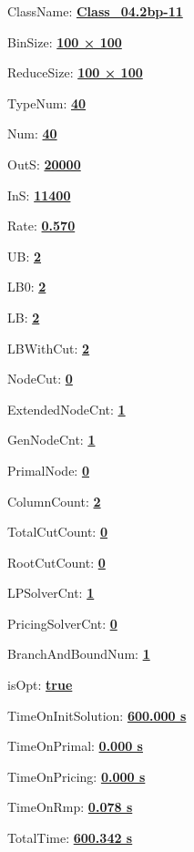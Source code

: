 \documentclass[11pt]{article}
\begin{document}
\pagestyle{empty}


ClassName: \underline{\textbf{Class_04.2bp-11}}
\par
BinSize: \underline{\textbf{100 × 100}}
\par
ReduceSize: \underline{\textbf{100 × 100}}
\par
TypeNum: \underline{\textbf{40}}
\par
Num: \underline{\textbf{40}}
\par
OutS: \underline{\textbf{20000}}
\par
InS: \underline{\textbf{11400}}
\par
Rate: \underline{\textbf{0.570}}
\par
UB: \underline{\textbf{2}}
\par
LB0: \underline{\textbf{2}}
\par
LB: \underline{\textbf{2}}
\par
LBWithCut: \underline{\textbf{2}}
\par
NodeCut: \underline{\textbf{0}}
\par
ExtendedNodeCnt: \underline{\textbf{1}}
\par
GenNodeCnt: \underline{\textbf{1}}
\par
PrimalNode: \underline{\textbf{0}}
\par
ColumnCount: \underline{\textbf{2}}
\par
TotalCutCount: \underline{\textbf{0}}
\par
RootCutCount: \underline{\textbf{0}}
\par
LPSolverCnt: \underline{\textbf{1}}
\par
PricingSolverCnt: \underline{\textbf{0}}
\par
BranchAndBoundNum: \underline{\textbf{1}}
\par
isOpt: \underline{\textbf{true}}
\par
TimeOnInitSolution: \underline{\textbf{600.000 s}}
\par
TimeOnPrimal: \underline{\textbf{0.000 s}}
\par
TimeOnPricing: \underline{\textbf{0.000 s}}
\par
TimeOnRmp: \underline{\textbf{0.078 s}}
\par
TotalTime: \underline{\textbf{600.342 s}}
\par
\newpage
\end{document}

